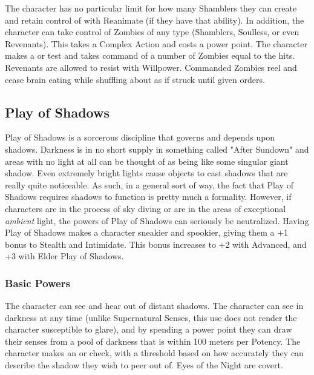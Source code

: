  The character has no particular limit for how many Shamblers they can create and retain control of with Reanimate (if they have that ability). In addition, the character can take control of Zombies of any type (Shamblers, Soulless, or even Revenants). This takes a Complex Action and costs a power point. The character makes a  or  test and takes command of a number of Zombies equal to the hits. Revenants are allowed to resist with Willpower. Commanded Zombies reel and cease brain eating while shuffling about as if struck until given orders.


\subsection{Play of Shadows}

Play of Shadows is a sorcerous discipline that governs and depends upon shadows. Darkness is in no short supply in something called "After Sundown" and areas with no light at all can be thought of as being like some singular giant shadow. Even extremely bright lights cause objects to cast shadows that are really quite noticeable. As such, in a general sort of way, the fact that Play of Shadows requires shadows to function is pretty much a formality. However, if characters are in the process of sky diving or are in the areas of exceptional \textit{ambient} light, the powers of Play of Shadows can seriously be neutralized. Having Play of Shadows makes a character sneakier and spookier, giving them a +1 bonus to Stealth and Intimidate. This bonus increases to +2 with Advanced, and +3 with Elder Play of Shadows.

\subsubsection{Basic Powers}

 The character can see and hear out of distant shadows. The character can see in darkness at any time (unlike Supernatural Senses, this use does not render the character susceptible to glare), and by spending a power point they can draw their senses from a pool of darkness  that is within 100 meters per Potency. The character makes an  or  check, with a threshold based on how accurately they can describe the shadow they wish to peer out of. Eyes of the Night are covert.

